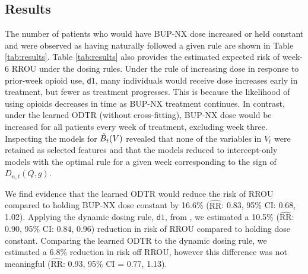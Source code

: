 \documentclass[11pt]{article}
\renewcommand{\d}{\mathsf{d}}
\theoremstyle{example}
\begin{document}
\subsection*{Results}

The number of patients who would have BUP-NX dose increased or held constant and were observed as having naturally followed a given rule are shown in Table \ref{tab:results}. Table \ref{tab:results} also provides the estimated expected risk of week-6 RROU under the dosing rules. Under the rule of increasing dose in response to prior-week opioid use, $\d1$, many individuals would receive dose increases early in treatment, but fewer as treatment progresses. This is because the likelihood of using opioids decreases in time as BUP-NX treatment continues. In contrast, under the learned ODTR (without cross-fitting), BUP-NX dose would be increased for all patients every week of treatment, excluding week three. Inspecting the models for $\Tilde{B}_t(V)$ revealed that none of the variables in $V_t$ were retained as selected features and that the models reduced to intercept-only models with the optimal rule for a given week corresponding to the sign of $D_{n, t}(Q, g)$. 

We find evidence that the learned ODTR would reduce the risk of RROU compared to holding BUP-NX dose constant by 16.6\% ($\hat{\text{RR}}$: 0.83, 95\% CI: 0.68, 1.02). Applying the dynamic dosing rule, $\d1$, from \citet{rudolph2022dose}, we estimated a 10.5\% ($\hat{\text{RR}}$: 0.90, 95\% CI: 0.84, 0.96) reduction in risk of RROU compared to holding dose constant. Comparing the learned ODTR to the dynamic dosing rule, we estimated a 6.8\% reduction in risk off RROU, however this difference was not meaningful ($\hat{\text{RR}}$: 0.93, 95\% CI = 0.77, 1.13).
\end{document}
